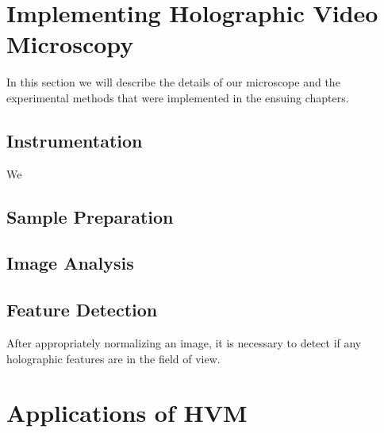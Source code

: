 


\section{Implementing Holographic Video Microscopy}

In this section we will describe the details of our microscope and
the experimental methods that were implemented in the ensuing chapters.



\subsection{Instrumentation}

We


\subsection{Sample Preparation}




\subsection{Image Analysis}


\subsection{Feature Detection}

After appropriately normalizing an image, it is necessary to detect if any holographic
features are in the field of view. 


\section{Applications of HVM}


